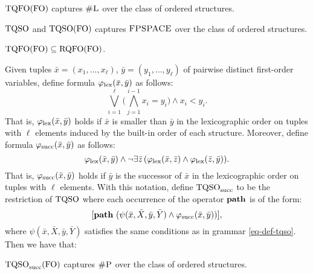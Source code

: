 \begin{theorem} \label{tqfo-shl}
	${\rm TQFO}({\rm FO})$ captures $\text{\sc \#L}$ over the class of ordered structures.
\end{theorem}


\begin{theorem} \label{tqso-fo-fpsace}
	${\rm TQSO}$ and ${\rm TQSO}({\rm FO})$ captures $\text{\sc FPSPACE}$ over the class of ordered structures.
\end{theorem}

\begin{theorem} \label{tqfo-subseteq}
	${\rm TQFO}({\rm FO}) \subseteq {\rm RQFO}({\rm FO})$.
\end{theorem}
Given tuples $\bar x = (x_1, \ldots, x_\ell)$, $\bar y = (y_1, \ldots, y_\ell)$ of pairwise distinct first-order variables, define formula $\varphi_{\text{\rm lex}}(\bar x, \bar y)$ as follows:
$$
\bigvee_{i = 1}^\ell \bigg(\bigwedge_{j = 1}^{i -1} x_i = y_i\bigg) \wedge x_i < y_i.
$$
That is, $\varphi_{\text{\rm lex}}(\bar x, \bar y)$ holds if $\bar x$ is smaller than $\bar y$ in the lexicographic order on tuples with $\ell$ elements induced by the built-in order of each structure. Moreover, define formula $\varphi_{\text{\rm succ}}(\bar x, \bar y)$ as follows:
$$
\varphi_{\text{\rm lex}}(\bar x, \bar y) \wedge \neg \exists \bar z \, (\varphi_{\text{\rm lex}}(\bar x, \bar z) \wedge \varphi_{\text{\rm lex}}(\bar z, \bar y)).
$$
That is, $\varphi_{\text{\rm succ}}(\bar x, \bar y)$ holds if $\bar y$ is the successor of $\bar x$ in the lexicographic order on tuples with $\ell$ elements.
With this notation, define ${\rm TQSO}_{\rm succ}$ to be the restriction of ${\rm TQSO}$ where each occurrence of the operator ${\bf path}$ is of the form:
$$
[{\bf path} \,\, (\psi(\bar{x}, \bar{X},\bar{y}, \bar{Y}) \wedge \varphi_{\text{\rm succ}}(\bar x, \bar y))],
$$
where $\psi(\bar{x}, \bar{X},\bar{y}, \bar{Y})$ satisfies the same conditions as in grammar \eqref{eq-def-tqso}. Then we have that:
\begin{theorem} \label{tqsos-shp}
	${\rm TQSO}_{\rm succ}({\rm FO})$ captures $\text{\sc \#P}$ over the class of ordered structures.
\end{theorem}

%



